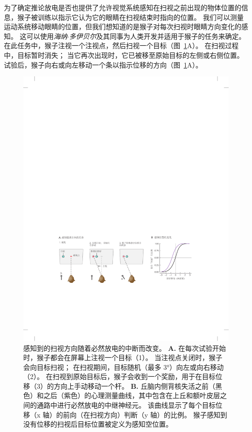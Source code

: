 为了确定推论放电是否也提供了允许视觉系统感知在扫视之前出现的物体位置的信息，猴子被训练以指示它认为它的眼睛在扫视结束时指向的位置。
我们可以测量运动系统移动眼睛的位置，但我们想知道的是猴子对每次扫视时眼睛方向变化的感知。
这可以使用\textit{海纳$\cdot$多伊贝尔}及其同事为人类开发并适用于猴子的任务来确定。
在此任务中，猴子注视一个注视点，然后扫视一个目标（图~\ref{fig:25_5}A）。
在扫视过程中，目标暂时消失；
当它再次出现时，它已被移至原始目标的左侧或右侧位置。
试验后，猴子向右或向左移动一个条以指示位移的方向（图~\ref{fig:25_5}A）。


\begin{figure}[htbp]
	\centering
	\includegraphics[width=0.95\linewidth]{chap25/fig_25_5}
	\caption{感知到的扫视方向随着必然放电的中断而改变。
		\textbf{A.} 在每次试验开始时，猴子都会在屏幕上注视一个目标（1）。
		当注视点关闭时，猴子会向目标扫视；
		在扫视期间，目标随机（最多 3°）向左或向右移动（2）。
		在扫视到原始目标后，猴子会收到一个奖励，用于在目标位移（3）的方向上手动移动一个杆。
		\textbf{B.} 丘脑内侧背核失活之前（黑色）和之后（紫色）的心理测量曲线，其中包含在上丘和额叶皮层之间的通路中进行必然放电的中继神经元。
		该曲线显示了每个目标位移（x 轴）的前向（在扫视方向）判断（y 轴）的比例。
		猴子感知到没有位移的扫视后目标位置被定义为感知空位置\cite{cavanaugh2016saccadic}。}
	\label{fig:25_5}
\end{figure}


